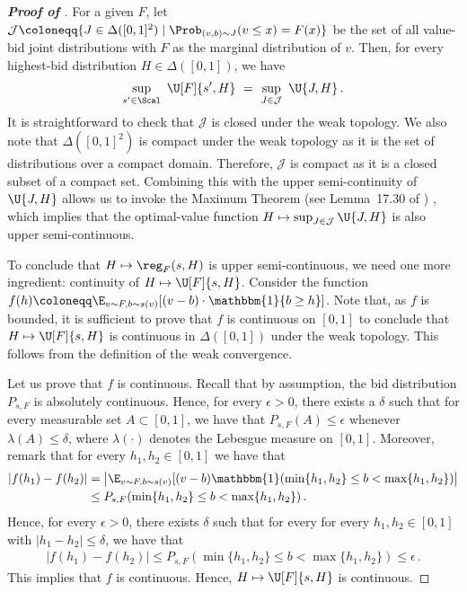 \begin{proof}[\textbf{Proof of }]
    For a given $F$, let $\mathcal J \coloneqq \{J \in \Delta([0,1]^2) \mid \Prob_{(v,b) \sim J}(v \leq x) = F(x)\}$ be the set of all value-bid joint distributions with $F$ as the marginal distribution of $v$. Then, for every highest-bid distribution $H \in \Delta([0,1])$, we have
	\begin{align*}
		\sup_{s' \in \Scal}\ \U[F]{s',H}\ =\ \sup_{J \in \mathcal J}\ \U{J,H}\,.
	\end{align*}
	It is straightforward to check that $\mathcal J$ is closed under the weak topology. We also note that $\Delta([0,1]^2)$ is compact under the weak topology as it is the set of distributions over a compact domain. Therefore, $\mathcal{J}$ is compact as it is a closed subset of a compact set. Combining this with the upper semi-continuity of $\U{J,H}$ allows us to invoke the Maximum Theorem (see Lemma~17.30 of \citealt{aliprantis2006infinite}) , which implies that the optimal-value function $H \mapsto \sup_{J \in \mathcal J} \U{J,H}$ is also upper semi-continuous.
	
    To conclude that $H \mapsto \reg_F(s,H)$ is upper semi-continuous, we need one more ingredient: continuity of $H \mapsto \U[F]{s,H}$. 
    Consider the function $f(h) \coloneqq \E_{v \sim F, b \sim s(v)}[(v-b) \cdot \mathbbm{1} \{b \geq h\}]$. Note that, as $f$ is bounded,  it is sufficient to prove that $f$ is continuous on $[0,1]$ to conclude that $H \mapsto \U[F]{s,H}$ is continuous in $\Delta([0,1])$ under the weak topology. This follows from the definition of the weak convergence. 
    
    Let us prove that $f$ is continuous. Recall that by assumption, the bid distribution $P_{s,F}$ is absolutely continuous. Hence, for every $\epsilon > 0$, there exists a $\delta$ such that for every measurable set $A \subset [0,1]$, we have that $P_{s,F}(A) \leq \epsilon$ whenever $\lambda(A) \leq \delta$, where $\lambda(\cdot)$ denotes the Lebesgue measure on $[0,1]$. Moreover, remark that for every $h_1,h_2 \in [0,1]$ we have that
    \begin{align*}
        |f(h_1) - f(h_2)| 
        &= \left| \E_{v \sim F, b\sim s(v)}[(v - b) \mathbbm{1}(\min\{h_1, h_2\} \leq b < \max\{h_1, h_2\}) \right| \\
        &\leq P_{s,F}(\min\{h_1, h_2\} \leq b < \max\{h_1, h_2\}) \,.
    \end{align*}
    Hence, for every $\epsilon > 0$, there exists $\delta$ such that for every for every $h_1,h_2 \in [0,1]$ with $|h_1 - h_2| \leq \delta$, we have that
	\begin{align*}
		|f(h_1) - f(h_2)| \leq
		P_{s,F}(\min\{h_1, h_2\} \leq b < \max\{h_1, h_2\})
		\leq \epsilon\,.
	\end{align*}
	This implies that $f$ is continuous. Hence, $H \mapsto \U[F]{s,H}$ is continuous.
    

\end{proof}
